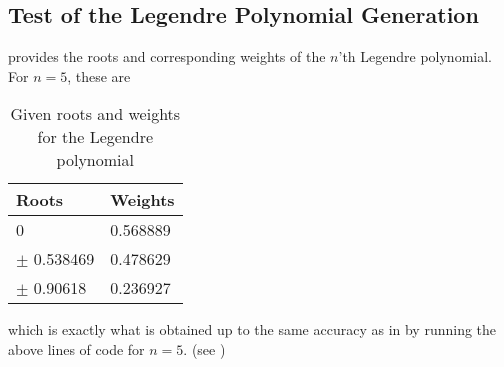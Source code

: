 \subsection{Test of the Legendre Polynomial Generation}
 provides the roots and corresponding weights of the $n$'th Legendre polynomial.
For $n=5$, these are 
\begin{table}[H]
\centering
\caption{Given roots and weights for the Legendre polynomial}
\begin{center}
\begin{tabular}{ | l | l | }
  \hline			
  Roots & Weights  \\
  \hline
  0 & 0.568889  \\
  \hline
  $\pm$ 0.538469 & 0.478629  \\
  \hline 
  $\pm$ 0.90618 & 0.236927 \\
  \hline 
\end{tabular}
\end{center}
\label{tab:testGLdpol}
\end{table}

which is exactly what is obtained up to the same accuracy as in  by running the above lines of code for $n=5$. (see )